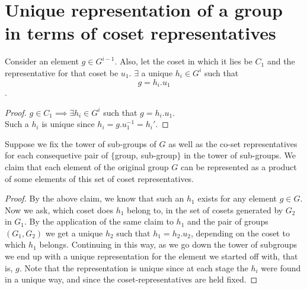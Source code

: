 \section{Unique representation of a group in terms of coset representatives}
\begin{claim}
Consider an element $g \in G^{i-1}$. Also, let the coset in which it lies be $C_{1}$ and the representative for that coset be $u_{1}$. $\exists$ a unique $h_{i} \in G^{i}$ such that 
$$g = h_{i}.u_{1}$$.
\end{claim}
\begin{proof}
$g \in C_{1} \implies \exists h_{i} \in G^{i}$ such that $g = h_{i}.u_{1}$.\\
Such a $h_{i}$ is unique since $h_{i} = g.u_{1}^{-1} = h_{i}'$. 
\end{proof}
\begin{theorem}
Suppose we fix the tower of sub-groups of $G$ as well as the co-set representatives for each
 consequetive pair of $\{$group, sub-group$\}$ in the tower of sub-groups. We claim that each element of the original group $G$ can be represented as a product of some elements of this set of coset representatives.
\end{theorem}
\begin{proof}

By the above claim, we know that such an $h_{1}$ exists for any element $g \in G$. Now we ask, which coset does $h_{1}$ belong to, in the set of cosets generated by $G_{2}$ in $G_{1}$. By the application of the same claim to $h_{1}$ and the pair of groups $(G_{1}, G_{2})$ we get a unique $h_{2}$ such that $h_{1} = h_{2}.u_{2}$, depending on the coset to which $h_{1}$ belongs. Continuing in this way, as we go down the tower of subgroups we end up with a unique representation for the element we started off with, that is, $g$. Note that the representation is unique since at each stage the $h_{i}$ were found in a unique way, and since the coset-representatives are held fixed.
\end{proof}

